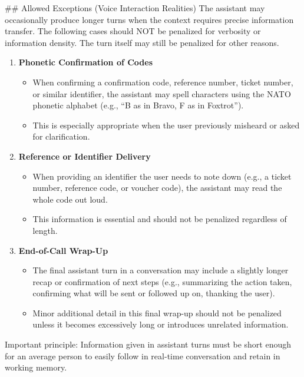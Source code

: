 \begin{tcolorbox}[promptbox, title={\small Conciseness Prompt}]
      \#\# Allowed Exceptions (Voice Interaction Realities)\newline
      The assistant may occasionally produce longer turns when the context requires precise information transfer. The following cases should NOT be penalized for verbosity or information density. The turn itself may still be penalized for other reasons.

      \begin{enumerate}
        \item \textbf{Phonetic Confirmation of Codes}
        \begin{itemize}
          \item When confirming a confirmation code, reference number, ticket number, or similar identifier, the assistant may spell characters using the NATO phonetic alphabet (e.g., ``B as in Bravo, F as in Foxtrot'').
          \item This is especially appropriate when the user previously misheard or asked for clarification.
        \end{itemize}
        \item \textbf{Reference or Identifier Delivery}
        \begin{itemize}
          \item When providing an identifier the user needs to note down (e.g., a ticket number, reference code, or voucher code), the assistant may read the whole code out loud.
          \item This information is essential and should not be penalized regardless of length.
        \end{itemize}
        \item \textbf{End-of-Call Wrap-Up}
        \begin{itemize}
          \item The final assistant turn in a conversation may include a slightly longer recap or confirmation of next steps (e.g., summarizing the action taken, confirming what will be sent or followed up on, thanking the user).
          \item Minor additional detail in this final wrap-up should not be penalized unless it becomes excessively long or introduces unrelated information.
        \end{itemize}
      \end{enumerate}

      Important principle: Information given in assistant turns must be short enough for an average person to easily follow in real-time conversation and retain in working memory.\newline


\end{tcolorbox}
